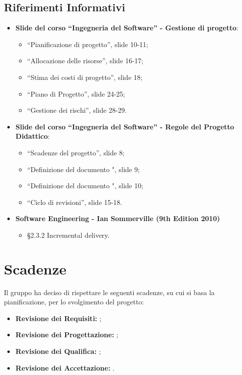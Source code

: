 \documentclass[PianoDiProgetto.tex]{subfiles}
\begin{document}
\subsection{Riferimenti Informativi}
\begin{itemize}
	\item \textbf{Slide del corso ``Ingegneria del Software'' - Gestione di progetto}:
	\begin{itemize}
		\item ``Pianificazione di progetto'', slide 10-11;
		\item ``Allocazione delle risorse'', slide 16-17;
		\item ``Stima dei costi di progetto'', slide 18;
		\item ``Piano di Progetto'', slide 24-25;
		\item ``Gestione dei rischi'', slide 28-29.
	\end{itemize}
	\item \textbf{Slide del corso ``Ingegneria del Software'' - Regole del Progetto Didattico}:\\
	\begin{itemize}
		\item ``Scadenze del progetto'', slide 8;
		\item ``Definizione del documento \tb", slide 9;
		\item ``Definizione del documento \pb", slide 10;
		\item ``Ciclo di revisioni'', slide 15-18.
	\end{itemize}
	\item \textbf{Software Engineering - Ian Sommerville (9th Edition 2010)}\\
		\begin{itemize}
			\item \S2.3.2 Incremental delivery.
		\end{itemize}

\end{itemize}

\section{Scadenze}
\label{scadenze}
Il gruppo \gruppo ha deciso di rispettare le seguenti scadenze, su cui si basa la pianificazione, per lo svolgimento del progetto:
\begin{itemize}
	\item \textbf{Revisione dei Requisiti:} ;
	\item \textbf{Revisione dei Progettazione:} ;
	\item \textbf{Revisione dei Qualifica:} ;
	\item \textbf{Revisione dei Accettazione:} .
\end{itemize}
\end{document}
